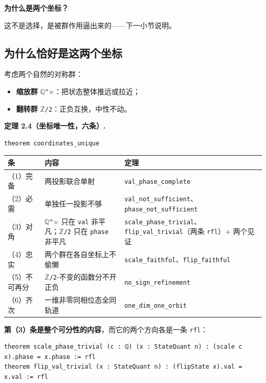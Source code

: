 \documentclass[11pt,a4paper]{ctexart}
\begin{document}
\textbf{为什么是两个坐标？}

这不是选择，是被群作用逼出来的——下一小节说明。

\subsection{为什么恰好是这两个坐标}

考虑两个自然的对称群：

\begin{itemize}
\item \textbf{缩放群} \texttt{\ensuremath{\mathbb{Q}}\textasciicircum{}\ensuremath{\times}}：把状态整体推远或拉近；
\item \textbf{翻转群} \texttt{\ensuremath{\mathbb{Z}}/2}：正负互换，中性不动。
\end{itemize}

\textbf{定理 2.4（坐标唯一性，六条）.}

\begin{lstlisting}
theorem coordinates_unique
\end{lstlisting}

\begin{center}\small
\begin{tabular}{lll}
\toprule
条 & 内容 & 定理 \\
\midrule
（1）完备 & 两投影联合单射 & \texttt{val\_phase\_complete} \\
（2）必需 & 单独任一投影不够 & \texttt{val\_not\_sufficient}、\texttt{phase\_not\_sufficient} \\
（3）对角 & \texttt{\ensuremath{\mathbb{Q}}\textasciicircum{}\ensuremath{\times}} 只在 \texttt{val} 非平凡；\texttt{\ensuremath{\mathbb{Z}}/2} 只在 \texttt{phase} 非平凡 & \texttt{scale\_phase\_trivial}、\texttt{flip\_val\_trivial}（两条 \texttt{rfl}）+ 两个见证 \\
（4）忠实 & 两个群在各自坐标上不偷懒 & \texttt{scale\_faithful}、\texttt{flip\_faithful} \\
（5）不可再分 & \texttt{\ensuremath{\mathbb{Z}}/2}-不变的函数分不开正负 & \texttt{no\_sign\_refinement} \\
（6）齐次 & 一维非零同相位态全同轨道 & \texttt{one\_dim\_one\_orbit} \\
\bottomrule
\end{tabular}
\end{center}

\textbf{第（3）条是整个可分性的内容}，而它的两个方向各是一条 \texttt{rfl}：

\begin{lstlisting}
theorem scale_phase_trivial (c : ℚ) (x : StateQuant n) : (scale c x).phase = x.phase := rfl
theorem flip_val_trivial (x : StateQuant n) : (flipState x).val = x.val := rfl
\end{lstlisting}
\end{document}
